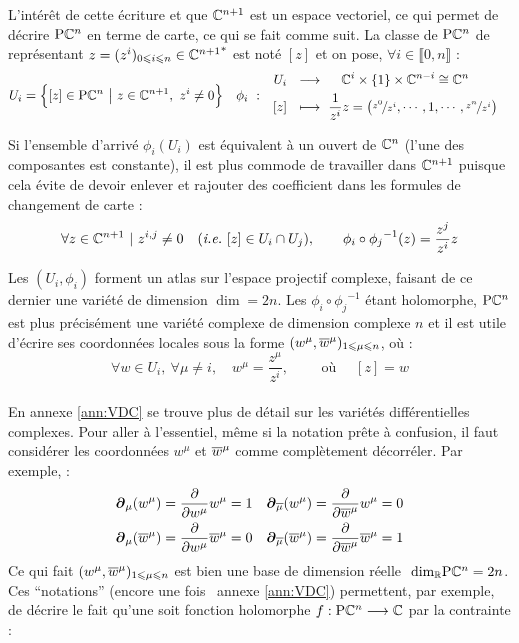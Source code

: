 L'intérêt de cette écriture et que $\C^{n+1}$ est un espace vectoriel, ce qui permet de décrire $\PC{n}$ en terme de carte, ce qui se fait comme suit.
La classe de $\PC{n}$ de représentant $z = (z^i)_{0\leq i\leq n}\in{\C^{n+1}}^*$ est noté $[z]$ et on pose, $\forall i\in\llbracket0,n\rrbracket$ :
\begin{align}
	U_i &= \Big\{[z]\in\PC{n}\ \big|\ z\in \C^{n+1},\ z^i\neq 0\Big\}  &  \phi_i\  :\quad &\begin{aligned}
		U_i\ \ &\lr\quad\ \C^{i}\times \{1\} \times\C^{n-i}\cong \C^{n} \\ [z]\ \ &\lmt\ \frac{1}{z^i}z = \big(\nicefrac{z^0}{z^i},\cdots, 1, \cdots, \nicefrac{z^n}{z^i}\big)
	\end{aligned}
\end{align}
\begin{remarque}
	Si l'ensemble d'arrivé $\phi_i(U_i)$ est équivalent à un ouvert de $\C^{n}$ (l'une des composantes est constante), il est plus commode de travailler dans $\C^{n+1}$ puisque cela évite de devoir enlever et rajouter des coefficient dans les formules de changement de carte :
	\[ \forall z\in\C^{n+1}\ |\ z^{i,j}\neq 0\quad (\ie~[z]\in U_i\cap U_j) ,\qquad \phi_i \circ {\phi_j}^{-1}(z) = \frac{z^j}{z^i}z\]
\end{remarque}
\skipl
Les $(U_i,\phi_i)$ forment un atlas sur l'espace projectif complexe, faisant de ce dernier une variété de dimension $\dim = 2n$. Les $\phi_i \circ {\phi_j}^{-1}$ étant holomorphe, $\PC{n}$ est plus précisément une variété complexe de dimension complexe $n$ et il est utile d'écrire ses coordonnées locales sous la forme $(w^\mu, \congu{w}^\mu)_{1\leq \mu \leq n}$, où :
\[\forall w\in U_i,\ \forall \mu\neq i,\quad w^\mu = \frac{z^\mu}{z^i},\qquad  \text{ où }\quad [z] = w\]
\\
En annexe \ref{ann:VDC} se trouve plus de détail sur les variétés différentielles complexes. Pour aller à l'essentiel, même si la notation prête à confusion, il faut considérer les coordonnées $w^\mu$ et $\congu{w}^\mu$ comme complètement décorréler. Par exemple, :
\begin{align*}
	\bt_\mu(w^\mu) &= \frac{\partial}{\partial w^\mu} w^\mu = 1  &  
	\bt_{\congu{\mu}}(w^\mu) = \frac{\partial}{\partial \congu{w}^\mu} w^\mu &= 0 
		\\
	\bt_\mu(\congu{w}^\mu) &= \frac{\partial}{\partial w^\mu} \congu{w}^\mu = 0  &  
	\bt_{\congu{\mu}}(\congu{w}^\mu) = \frac{\partial}{\partial \congu{w}^\mu} \congu{w}^\mu &= 1
\end{align*}
Ce qui fait $(w^\mu, \congu{w}^\mu)_{1\leq \mu \leq n}$ est bien une base de dimension réelle $\ \dim[\R]\PC{n} = 2n$. Ces ``notations'' (encore une fois \cf~annexe \ref{ann:VDC}) permettent, par exemple, de décrire le fait qu'une soit fonction holomorphe $f: \PC{n}\lr \C$ par la contrainte :
